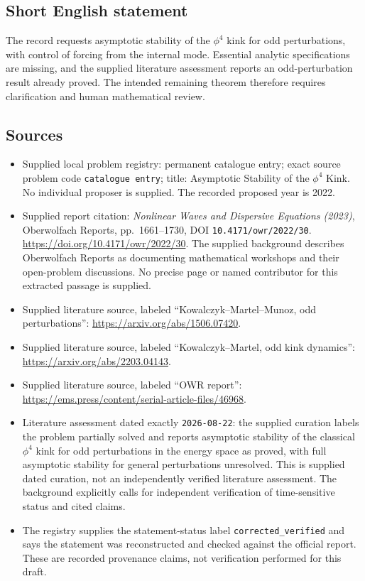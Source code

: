 \documentclass[11pt]{article}
\begin{document}
\subsection{Short English statement}
The record requests asymptotic stability of the $\phi^4$ kink for odd perturbations, with control of forcing from the internal mode. Essential analytic specifications are missing, and the supplied literature assessment reports an odd-perturbation result already proved. The intended remaining theorem therefore requires clarification and human mathematical review.
\subsection{Sources}
\begin{itemize}
\item Supplied local problem registry: permanent catalogue entry; exact source problem code \texttt{catalogue entry}; title: Asymptotic Stability of the $\phi^4$ Kink. No individual proposer is supplied. The recorded proposed year is 2022.
\item Supplied report citation: \emph{Nonlinear Waves and Dispersive Equations (2023)}, Oberwolfach Reports, pp.~1661--1730, DOI \texttt{10.4171/owr/2022/30}. \url{https://doi.org/10.4171/owr/2022/30}. The supplied background describes Oberwolfach Reports as documenting mathematical workshops and their open-problem discussions. No precise page or named contributor for this extracted passage is supplied.
\item Supplied literature source, labeled ``Kowalczyk--Martel--Munoz, odd perturbations'': \url{https://arxiv.org/abs/1506.07420}.
\item Supplied literature source, labeled ``Kowalczyk--Martel, odd kink dynamics'': \url{https://arxiv.org/abs/2203.04143}.
\item Supplied literature source, labeled ``OWR report'': \url{https://ems.press/content/serial-article-files/46968}.
\item Literature assessment dated exactly \texttt{2026-08-22}: the supplied curation labels the problem partially solved and reports asymptotic stability of the classical $\phi^4$ kink for odd perturbations in the energy space as proved, with full asymptotic stability for general perturbations unresolved. This is supplied dated curation, not an independently verified literature assessment. The background explicitly calls for independent verification of time-sensitive status and cited claims.
\item The registry supplies the statement-status label \texttt{corrected\_verified} and says the statement was reconstructed and checked against the official report. These are recorded provenance claims, not verification performed for this draft.
\end{itemize}
\end{document}
